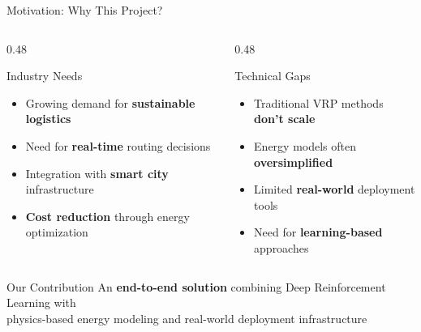 \documentclass[aspectratio=169,11pt]{beamer}
\begin{document}
\begin{frame}{Motivation: Why This Project?}
    \begin{columns}[T]
        \begin{column}{0.48\textwidth}
            \begin{block}{Industry Needs}
                \begin{itemize}
                    \item Growing demand for \textbf{sustainable logistics}
                    \item Need for \textbf{real-time} routing decisions
                    \item Integration with \textbf{smart city} infrastructure
                    \item \textbf{Cost reduction} through energy optimization
                \end{itemize}
            \end{block}
        \end{column}
        \begin{column}{0.48\textwidth}
            \begin{block}{Technical Gaps}
                \begin{itemize}
                    \item Traditional VRP methods \textbf{don't scale}
                    \item Energy models often \textbf{oversimplified}
                    \item Limited \textbf{real-world} deployment tools
                    \item Need for \textbf{learning-based} approaches
                \end{itemize}
            \end{block}
        \end{column}
    \end{columns}
    
    \vspace{0.5cm}
    \begin{exampleblock}{Our Contribution}
        \centering
        An \textbf{end-to-end solution} combining Deep Reinforcement Learning with\\
        physics-based energy modeling and real-world deployment infrastructure
    \end{exampleblock}
\end{frame}
\end{document}
